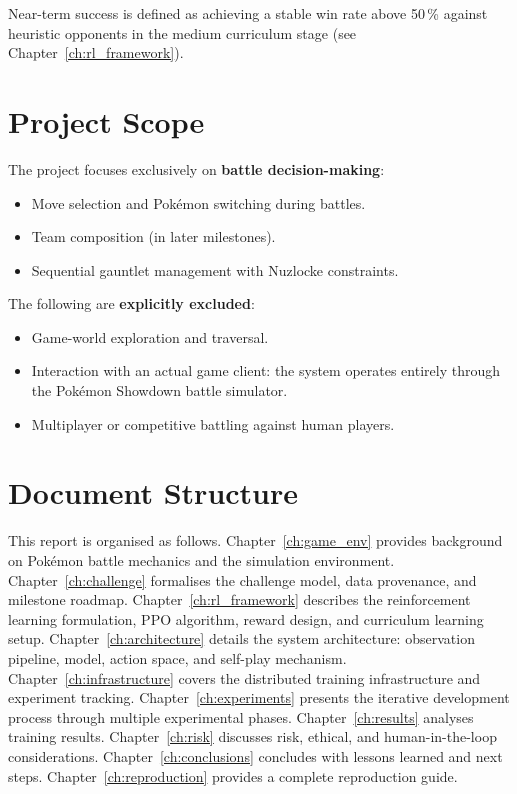 Near-term success is defined as achieving a stable win rate above 50\,\%
against heuristic opponents in the medium curriculum stage (see
Chapter~\ref{ch:rl_framework}).

\section{Project Scope}

The project focuses exclusively on \textbf{battle decision-making}:

\begin{itemize}
  \item Move selection and Pok\'{e}mon switching during battles.
  \item Team composition (in later milestones).
  \item Sequential gauntlet management with Nuzlocke constraints.
\end{itemize}

The following are \textbf{explicitly excluded}:

\begin{itemize}
  \item Game-world exploration and traversal.
  \item Interaction with an actual game client: the system operates entirely
        through the Pok\'{e}mon Showdown battle simulator.
  \item Multiplayer or competitive battling against human players.
\end{itemize}

\section{Document Structure}

This report is organised as follows.  Chapter~\ref{ch:game_env} provides
background on Pok\'{e}mon battle mechanics and the simulation environment.
Chapter~\ref{ch:challenge} formalises the challenge model, data provenance,
and milestone roadmap.  Chapter~\ref{ch:rl_framework} describes the
reinforcement learning formulation, PPO algorithm, reward design, and
curriculum learning setup.  Chapter~\ref{ch:architecture} details the system
architecture: observation pipeline, model, action space, and self-play
mechanism.  Chapter~\ref{ch:infrastructure} covers the distributed training
infrastructure and experiment tracking.  Chapter~\ref{ch:experiments} presents
the iterative development process through multiple experimental phases.
Chapter~\ref{ch:results} analyses training results.  Chapter~\ref{ch:risk}
discusses risk, ethical, and human-in-the-loop considerations.
Chapter~\ref{ch:conclusions} concludes with lessons learned and next steps.
Chapter~\ref{ch:reproduction} provides a complete reproduction guide.
